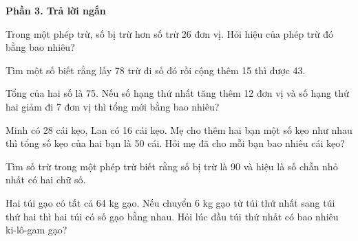 \textbf{Phần 3. Trả lời ngắn}

\begin{ex} %
Trong một phép trừ, số bị trừ hơn số trừ 26 đơn vị. Hỏi hiệu của phép trừ đó bằng bao nhiêu?
\end{ex}

\begin{ex} %
Tìm một số biết rằng lấy 78 trừ đi số đó rồi cộng thêm 15 thì được 43.
\end{ex}

\begin{ex} %
Tổng của hai số là 75. Nếu số hạng thứ nhất tăng thêm 12 đơn vị và số hạng thứ hai giảm đi 7 đơn vị thì tổng mới bằng bao nhiêu?
\end{ex}

\begin{ex} %
Minh có 28 cái kẹo, Lan có 16 cái kẹo. Mẹ cho thêm hai bạn một số kẹo như nhau thì tổng số kẹo của hai bạn là 50 cái. Hỏi mẹ đã cho mỗi bạn bao nhiêu cái kẹo?
\end{ex}

\begin{ex} %
Tìm số trừ trong một phép trừ biết rằng số bị trừ là 90 và hiệu là số chẵn nhỏ nhất có hai chữ số.
\end{ex}

\begin{ex} %
Hai túi gạo có tất cả 64 kg gạo. Nếu chuyển 6 kg gạo từ túi thứ nhất sang túi thứ hai thì hai túi có số gạo bằng nhau. Hỏi lúc đầu túi thứ nhất có bao nhiêu ki-lô-gam gạo?
\end{ex}
